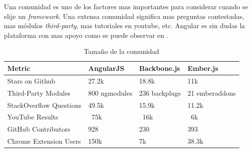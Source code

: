 Una comunidad es uno de los factores mas importantes para considerar cuando se elije un \textit{framework}. Una extensa comunidad significa mas preguntas contestadas, mas módulos \textit{third-party}, mas tutoriales en youtube, etc. Angular es sin dudas la plataforma con mas apoyo como se puede observar en .
%
%
\begin{table}[h!]
    \tiny
   
\begin{tabular}{ |L{0.1\paperwidth}|L{0.2\paperwidth}|L{0.2\paperwidth}|L{0.2\paperwidth}|}
\hline
	Metric&
	AngularJS &
	Backbone.js &
	Ember.js
	
\\ \hline
	Stars on Github&
	27.2k&
	18.8k&
	11k
	
\\ \hline
	Third-Party Modules&
	800 ngmodules&
	236 backplugs&
	21 emberaddons
	
\\ \hline
	StackOverflow Questions&
	49.5k&
	15.9k&
	11.2k
	
\\ \hline
	YouTube Results&
	~75k&
	~16k&
	~6k
	
\\ \hline
	GitHub Contributors&
	928&
	230&
	393
	
\\ \hline
	Chrome Extension Users&
	150k&
	7k&
	38.3k
				
\\ \hline
\end{tabular}
    \caption{ Tamaño de la comunidad}
    \label{tab:framework_community}
\end{table}

